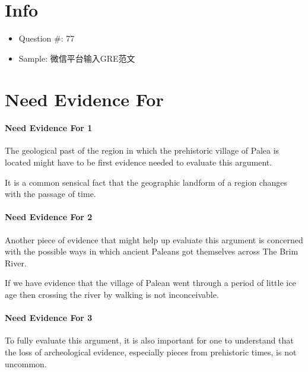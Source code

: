 \documentclass{article}
\begin{document}
  \section{Info}
    \begin{itemize}
      \item Question \#: 77
      \item Sample: 微信平台输入GRE范文
    \end{itemize}

  \section{Need Evidence For}

    \paragraph{Need Evidence For 1} The geological past of the region in which
    the prehistoric village of Palea is located might have to be first
    evidence needed to evaluate this argument.

    It is a common sensical fact that the geographic landform of a region
    changes with the passage of time.

    \paragraph{Need Evidence For 2} Another piece of evidence that might help
    up evaluate this argument is concerned with the possible ways in which
    ancient Paleans got themselves across The Brim River.

    If we have evidence that the village of Palean went through a period of
    little ice age then crossing the river by walking is not inconceivable.

    \paragraph{Need Evidence For 3} To fully evaluate this argument, it is also
    important for one to understand that the loss of archeological evidence,
    especially pieces from prehistoric times, is not uncommon.
\end{document}
